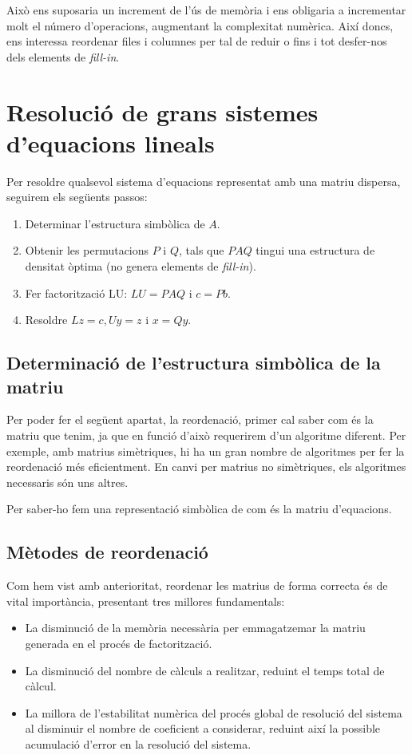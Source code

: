 \documentclass[11pt,a4paper,twoside]{report}
\begin{document}
Això ens suposaria un increment de l'ús de memòria i ens obligaria a incrementar molt el número d'operacions, augmentant la complexitat numèrica. Així doncs, ens interessa reordenar files i columnes per tal de reduir o fins i tot desfer-nos dels elements de \textit{fill-in}. 

\section{Resolució de grans sistemes d'equacions lineals}

Per resoldre qualsevol sistema d'equacions representat amb una matriu dispersa, seguirem els següents passos:

\begin{enumerate}
	\item Determinar l'estructura simbòlica de $A$.
	\item Obtenir les permutacions $P$ i $Q$, tals que $PAQ$ tingui una estructura de densitat òptima (no genera elements de \textit{fill-in}).
	\item Fer factorització LU: $LU = PAQ$ i $c = Pb$.
	\item Resoldre $Lz = c, Uy = z$ i $x=Qy$.
\end{enumerate}

\subsection{Determinació de l'estructura simbòlica de la matriu}

Per poder fer el següent apartat, la reordenació, primer cal saber com és la matriu que tenim, ja que en funció d'això requerirem d'un algoritme diferent. Per exemple, amb matrius simètriques, hi ha un gran nombre de algoritmes per fer la reordenació més eficientment. En canvi per matrius no simètriques, els algoritmes necessaris són uns altres.

Per saber-ho fem una representació simbòlica de com és la matriu d'equacions.

\subsection{Mètodes de reordenació}

Com hem vist amb anterioritat, reordenar les matrius de forma correcta és de vital importància, presentant tres millores fundamentals:

\begin{itemize}
	\item La disminució de la memòria necessària per emmagatzemar la matriu generada en el procés de factorització.
	\item La disminució del nombre de càlculs a realitzar, reduint el temps total de càlcul.
	\item La millora de l'estabilitat numèrica del procés global de resolució del sistema al disminuir el nombre de coeficient a considerar, reduint així la possible acumulació d'error en la resolució del sistema.
\end{itemize}
\end{document}
